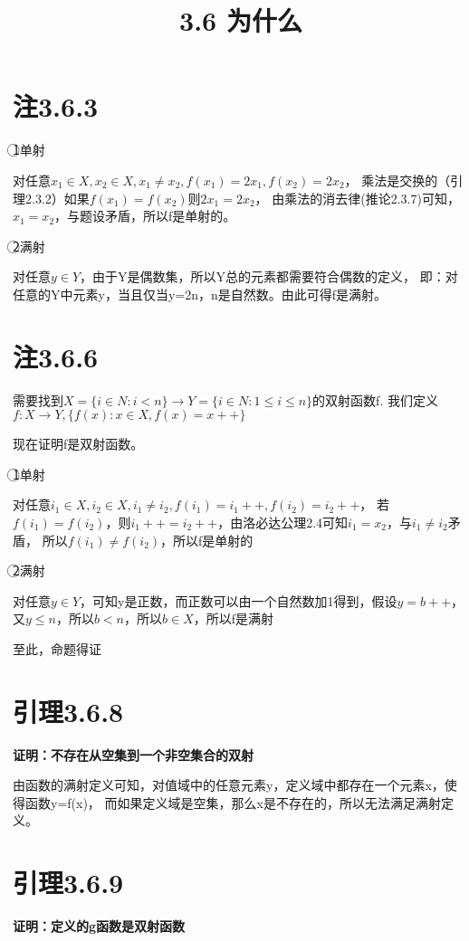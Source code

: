 \documentclass{article}
\theoremstyle{mystyle}
\theoremstyle{zproofstyle}
\begin{document}
\title{3.6 为什么}
\maketitle

\section*{注3.6.3}
\textcircled{1}单射

对任意$x_1 \in X, x_2 \in X, x_1 \neq x_2, f(x_1)=2x_1,f(x_2)=2x_2$，
乘法是交换的（引理2.3.2）如果$f(x_1)=f(x_2)$则$2x_1=2x_2$，
由乘法的消去律(推论2.3.7)可知，$x_1=x_2$，与题设矛盾，所以f是单射的。

\textcircled{2}满射

对任意$y \in Y$，由于Y是偶数集，所以Y总的元素都需要符合偶数的定义，
即：对任意的Y中元素y，当且仅当y=2n，n是自然数。由此可得f是满射。

\section*{注3.6.6}
需要找到$X=\{i \in N: i<n\} \rightarrow Y=\{i \in N: 1\leq i \leq n \}$的双射函数f.
我们定义$f: X \rightarrow Y, \{f(x): x \in X, f(x) = x ++\}$

现在证明f是双射函数。

\textcircled{1}单射

对任意$i_1 \in X, i_2 \in X, i_1 \neq i_2, f(i_1) = i_1++, f(i_2) = i_2++$，
若$f(i_1) = f(i_2)$，则$i_1++ = i_2++$，由洛必达公理2.4可知$i_1 = x_2$，与$i_1 \neq i_2$矛盾，
所以$f(i_1) \neq f(i_2)$，所以f是单射的

\textcircled{2}满射

对任意$y \in Y$，可知y是正数，而正数可以由一个自然数加1得到，假设$y = b++$，
又$y \leq n$，所以$b < n$，所以$b \in X$，所以f是满射

至此，命题得证


\section*{引理3.6.8}
\textbf{证明：不存在从空集到一个非空集合的双射}

由函数的满射定义可知，对值域中的任意元素y，定义域中都存在一个元素x，使得函数y=f(x)，
而如果定义域是空集，那么x是不存在的，所以无法满足满射定义。

\section*{引理3.6.9}
\textbf{证明：定义的g函数是双射函数}
\end{document}
